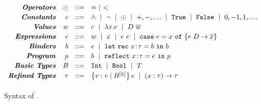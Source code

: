 \begin{figure}[t!]
\centering
\captionsetup{justification=centering}
\vspace{-5mm}
\centering
$$
\begin{array}{rrcl}
\emphbf{Operators}
  & \odot
  & ::= & = \spmid  <
\\[0.03in]

\emphbf{Constants}
  & c
  & ::=
  & \land \spmid \lnot \spmid \odot \spmid +,-,\dots  \spmid
      \etrue\spmid \efalse \spmid 0, -1, 1, \dots
\\[0.03in]

\emphbf{Values} 
  & w & ::=&  c
             \spmid \efun{x}{\typ}{e} \spmid D\ \overline{w}
\\[0.03in]

\emphbf{Expressions} 
  & e & ::=    & w \spmid x \spmid \eapp{e}{e}  
  \spmid \ecase{x}{e}{\dc}{\overline{x}}{e}
\\[0.03in]

\emphbf{Binders} 
  & \bd & ::= & e \spmid \eletb{x}{\gtyp}{\bd}{\bd}
\\[0.03in]

\emphbf{Program} 
  & \prog & ::= & \bd \spmid \erefb{x}{\gtyp}{e}{\prog}
\\[0.03in]


\emphbf{Basic Types} 
  & \btyp
  & ::=
  & \tint \spmid \tbool \spmid T
\\[0.03in]

\emphbf{Refined Types} 
  & \typ
  & ::=   & \tref{v}{\btyp^{[\tlabel]}}{\reft} \spmid \tfun{x}{\typ}{\typ}
\\[0.05in]
\end{array}
$$
\caption{{Syntax of \corelan.}}
\label{fig:syntax}
\vspace{-2mm}
\end{figure}

